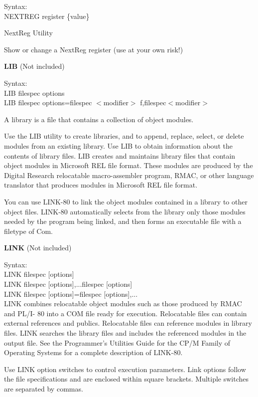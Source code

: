 \hangindent=0.7cm Syntax:\\
NEXTREG register \{value\}

NextReg Utility

Show or change a NextReg register (use at your own risk!)

\textbf{LIB} (Not included)

\hangindent=0.7cm Syntax:\\
LIB filespec options\\
LIB filespec options=filespec \(<\)modifier\(>\) f,filespec\(<\)modifier\(>\)

A library is a file that contains a collection of object modules.

Use the LIB utility to create libraries, and to append, replace,
select, or delete modules from an existing library. Use LIB to obtain
information about the contents of library files.  LIB creates and
maintains library files that contain object modules in Microsoft REL
file format.  These modules are produced by the Digital Research
relocatable macro-assembler program, RMAC, or other language
translator that produces modules in Microsoft REL file format.

You can use LINK-80 to link the object modules contained in a library
to other object files.  LINK-80 automatically selects from the library
only those modules needed by the program being linked, and then forms
an executable file with a filetype of Com.

\textbf{LINK} (Not included)

\hangindent=0.7cm Syntax:\\
LINK filespec [options]\\
LINK filespec [options],...filespec [options]\\
LINK filespec [options]=filespec [options],...\\

LINK combines relocatable object modules such as those produced by
RMAC and PL/I- 80 into a COM file ready for execution. Relocatable
files can contain external references and publics.  Relocatable files
can reference modules in library files. LINK searches the library
files and includes the referenced modules in the output file. See the
Programmer's Utilities Guide for the CP/M Family of Operating Systems
for a complete description of LINK-80.

Use LINK option switches to control execution parameters. Link options
follow the file specifications and are enclosed within square
brackets. Multiple switches are separated by commas.

